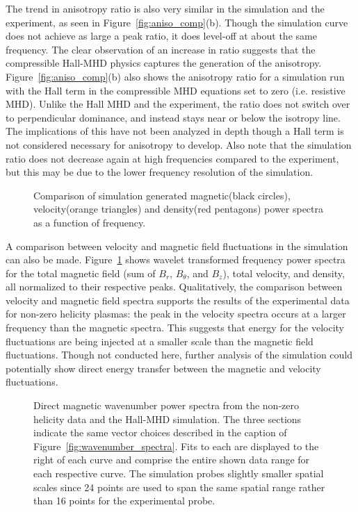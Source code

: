 \documentclass[preprint2]{aastex}
\begin{document}
The trend in anisotropy ratio is also very similar in the simulation and the experiment, as seen in Figure~\ref{fig:aniso_comp}(b). Though the simulation curve does not achieve as large a peak ratio, it does level-off at about the same frequency. The clear observation of an increase in ratio suggests that the compressible Hall-MHD physics captures the generation of the anisotropy. Figure~\ref{fig:aniso_comp}(b) also shows the anisotropy ratio for a simulation run with the Hall term in the compressible MHD equations set to zero (i.e. resistive MHD). Unlike the Hall MHD and the experiment, the ratio does not switch over to perpendicular dominance, and instead stays near or below the isotropy line. The implications of this have not been analyzed in depth though a Hall term is not considered necessary for anisotropy to develop. Also note that the simulation ratio does not decrease again at high frequencies compared to the experiment, but this may be due to the lower frequency resolution of the simulation.

\begin{figure}
\caption{\label{fig:bflow_comp} Comparison of simulation generated magnetic(black circles), velocity(orange triangles) and density(red pentagons) power spectra as a function of frequency.}
\end{figure}

A comparison between velocity and magnetic field fluctuations in the simulation can also be made. Figure~\ref{fig:bflow_comp} shows wavelet transformed frequency power spectra for the total magnetic field (sum of $B_{r}$, $B_{\theta}$, and $B_{z}$), total velocity, and density, all normalized to their respective peaks. Qualitatively, the comparison between velocity and magnetic field spectra supports the results of the experimental data for non-zero helicity plasmas: the peak in the velocity spectra occurs at a larger frequency than the magnetic spectra. This suggests that energy for the velocity fluctuations are being injected at a smaller scale than the magnetic field fluctuations. Though not conducted here, further analysis of the simulation could potentially show direct energy transfer between the magnetic and velocity fluctuations.

\begin{figure}
\caption{\label{fig:sim_wavenumber_comp} Direct magnetic wavenumber power spectra from the non-zero helicity data and the Hall-MHD simulation. The three sections indicate the same vector choices described in the caption of Figure~\ref{fig:wavenumber_spectra}. Fits to each are displayed to the right of each curve and comprise the entire shown data range for each respective curve. The simulation probes slightly smaller spatial scales since 24 points are used to span the same spatial range rather than 16 points for the experimental probe.}
\end{figure}
\end{document}

